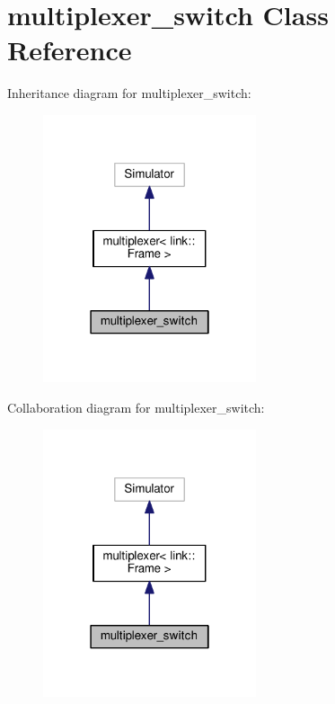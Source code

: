 \hypertarget{classmultiplexer__switch}{}\section{multiplexer\+\_\+switch Class Reference}
\label{classmultiplexer__switch}


Inheritance diagram for multiplexer\+\_\+switch\+:\nopagebreak
\begin{figure}[H]
\begin{center}
\leavevmode
\includegraphics[width=178pt]{classmultiplexer__switch__inherit__graph}
\end{center}
\end{figure}


Collaboration diagram for multiplexer\+\_\+switch\+:\nopagebreak
\begin{figure}[H]
\begin{center}
\leavevmode
\includegraphics[width=178pt]{classmultiplexer__switch__coll__graph}
\end{center}
\end{figure}
